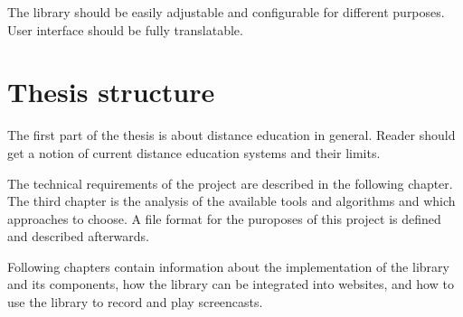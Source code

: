 The library should be easily adjustable and configurable for different purposes. User interface should be fully translatable.

\section*{Thesis structure}
The first part of the thesis is about distance education in general. Reader should get a notion of current distance education systems and their limits.

The technical requirements of the project are described in the following chapter. The third chapter is the analysis of the available tools and algorithms and which approaches to choose. A file format for the puroposes of this project is defined and described afterwards.

Following chapters contain information about the implementation of the library and its components, how the library can be integrated into websites, and how to use the library to record and play screencasts.